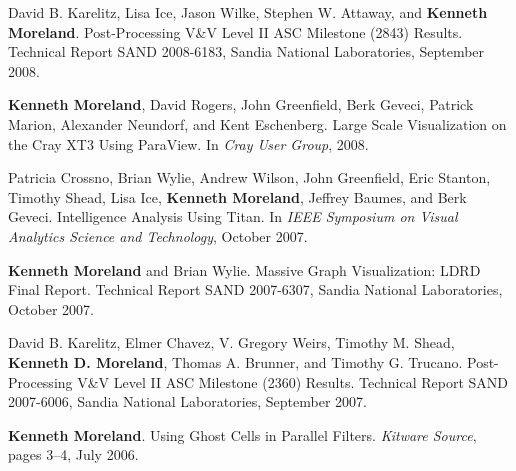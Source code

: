 \begin{enumerate}[label={[\arabic*]}, left=0pt]
\item  %
  David B. Karelitz, Lisa Ice, Jason Wilke, Stephen W. Attaway, and \textbf{Kenneth Moreland}.
  Post-Processing {V\&V} Level {II} {ASC} Milestone (2843) Results.
Technical Report SAND 2008-6183, Sandia National Laboratories, September 2008.
\item  %
  \textbf{Kenneth Moreland}, David Rogers, John Greenfield, Berk Geveci, Patrick Marion, Alexander Neundorf, and Kent Eschenberg.
  Large Scale Visualization on the {Cray XT3} Using ParaView.
  In \emph{Cray User Group}, 2008.
\item  %
  Patricia Crossno, Brian Wylie, Andrew Wilson, John Greenfield, Eric Stanton, Timothy Shead, Lisa Ice, \textbf{Kenneth Moreland}, Jeffrey Baumes, and Berk Geveci.
  Intelligence Analysis Using Titan.
  In \emph{IEEE Symposium on Visual Analytics Science and Technology}, October 2007.
\item  %
  \textbf{Kenneth Moreland} and Brian Wylie.
  Massive Graph Visualization: LDRD Final Report.
Technical Report SAND 2007-6307, Sandia National Laboratories, October 2007.
\item  %
  David B. Karelitz, Elmer Chavez, V. Gregory Weirs, Timothy M. Shead, \textbf{Kenneth D. Moreland}, Thomas A. Brunner, and Timothy G. Trucano.
  Post-Processing {V\&V} Level {II} {ASC} Milestone (2360) Results.
Technical Report SAND 2007-6006, Sandia National Laboratories, September 2007.
\item  %
  \textbf{Kenneth Moreland}.
  Using Ghost Cells in Parallel Filters.
  \emph{Kitware Source}, pages 3--4, July 2006.
\end{enumerate}